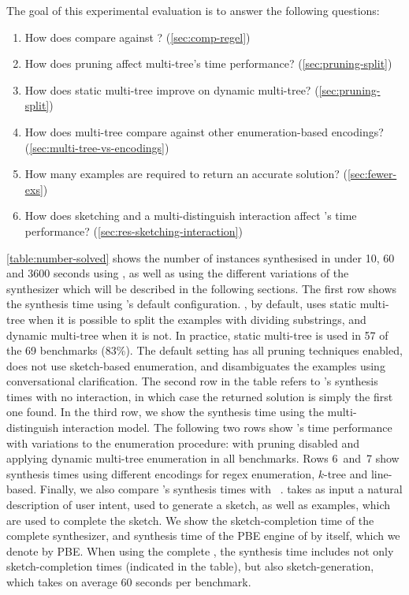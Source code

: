 \bigskip\noindent
The goal of this experimental evaluation is to answer the following questions:

\begin{enumerate}[label=\textbf{Q\arabic*}.]
%
\item How does \Forest{} compare against \Regel? (\autoref{sec:comp-regel})
%
\item How does pruning affect multi-tree's time performance? (\autoref{sec:pruning-split})
%
\item How does %
static multi-tree improve on dynamic multi-tree? (\autoref{sec:pruning-split})
%
\item How does multi-tree compare against other enumeration-based encodings? (\autoref{sec:multi-tree-vs-encodings})
%
\item How many examples are required to return an accurate solution? (\autoref{sec:fewer-exs})
%
\item How does sketching and a multi-distinguish interaction affect \Forest's time performance? (\autoref{sec:res-sketching-interaction})
\end{enumerate}




\autoref{table:number-solved} shows the number of instances synthesised in under 10, 60 and 3600 seconds using \Forest{}, as well as using the different variations of the synthesizer which will be described in the following sections.
The first row shows the synthesis time using \Forest's default configuration.
\Forest{}, by default, uses static multi-tree when it is possible to split the examples with dividing substrings, and dynamic multi-tree when it is not.
In practice, static multi-tree is used in 57 of the 69 benchmarks (83\%). The default setting has all pruning techniques enabled, does not use sketch-based enumeration, and disambiguates the examples using conversational clarification.
The second row in the table refers to \Forest's synthesis times with no interaction, in which case the returned solution is simply the first one found.
In the third row, we show the synthesis time using the multi-distinguish interaction model.
The following two rows show \Forest's time performance with variations to the enumeration procedure: with pruning disabled and applying dynamic multi-tree enumeration in all benchmarks.
Rows 6~and~7 show synthesis times using different encodings for regex enumeration, \(k\)-tree and line-based.
Finally, we also compare \Forest's synthesis times with \Regel~\cite{Regel20}.
\Regel takes as input a natural description of user intent, used to generate a sketch, as well as examples, which are used to complete the sketch. We show the sketch-completion time of the complete \Regel synthesizer, and synthesis time of the PBE engine of \Regel by itself, which we denote by \Regel PBE. When using the complete \Regel, the synthesis time includes not only sketch-completion times (indicated in the table), but also sketch-generation, which takes on average 60 seconds per benchmark. %

